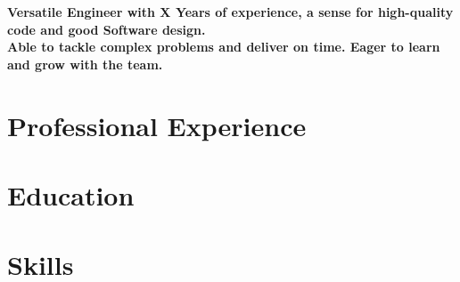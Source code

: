 \documentclass[letter,10pt]{article}
\begin{document}
\begin{center}
\textbf{Versatile Engineer with X Years of experience, a sense for high-quality code and good Software design.\\
Able to tackle complex problems and deliver on time. Eager to learn and grow with the team.}
\end{center}

\section{Professional Experience}


\section{Education}


\section{Skills}

\end{document}
